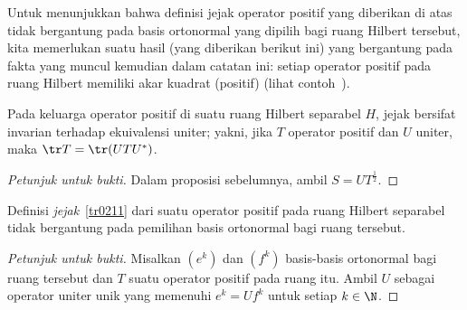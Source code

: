 Untuk menunjukkan bahwa definisi jejak operator positif yang diberikan di atas tidak bergantung pada basis ortonormal yang dipilih bagi
ruang Hilbert tersebut, kita memerlukan suatu hasil (yang diberikan berikut ini) yang bergantung pada fakta yang muncul kemudian dalam catatan ini: setiap operator positif pada ruang Hilbert
memiliki akar kuadrat (positif) (lihat contoh~).

\begin{prop}\label{tr0221} Pada keluarga operator positif di suatu ruang Hilbert separabel $H$, jejak bersifat invarian terhadap ekuivalensi uniter;
yakni, jika $T$ operator positif dan $U$ uniter, maka $\tr T = \tr(UTU^*)$.
\end{prop}

\begin{proof}[\emph{Petunjuk untuk bukti}] Dalam proposisi sebelumnya, ambil $S = UT^{\frac12}$.    \ns
\end{proof}

\begin{prop}\label{tr0224} Definisi \emph{jejak}~\ref{tr0211} dari suatu operator positif pada ruang Hilbert separabel tidak bergantung
pada pemilihan basis ortonormal bagi ruang tersebut.
\end{prop}

\begin{proof}[\emph{Petunjuk untuk bukti}] Misalkan $(e^k)$ dan $(f^k)$ basis-basis ortonormal bagi ruang tersebut dan $T$ suatu operator positif
pada ruang itu. Ambil $U$ sebagai operator uniter unik yang memenuhi $e^k = Uf^k$ untuk setiap $k \in \N$.  \ns
\end{proof}
